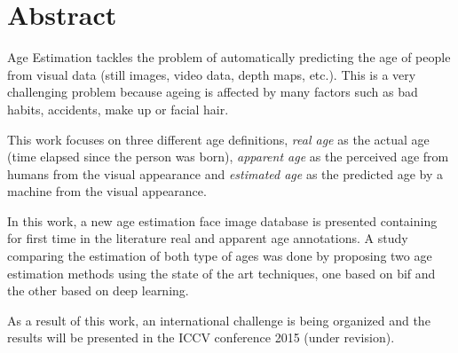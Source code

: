 \chapter*{Abstract}

Age Estimation tackles the problem of automatically predicting the age of people from visual data (still images, video data, depth maps, etc.). 
This is a very challenging problem because ageing is affected by many factors \cite{shephard1997aging} such as bad habits, accidents, make up or facial hair.

This work focuses on three different age definitions, \textit{real age} as the actual age (time elapsed since the person was born), \textit{apparent age} as the perceived age from humans from the visual appearance and \textit{estimated age} as the predicted age by a machine from the visual appearance.

In this work, a new age estimation face image database is presented containing for first time in the literature real and apparent age annotations. A study comparing the estimation of both type of ages was done by proposing two age estimation methods using the state of the art techniques, one based on \acrfull{bif} and the other based on deep learning.

As a result of this work, an international challenge is being organized and the results will be presented in the ICCV conference 2015 (under revision).

